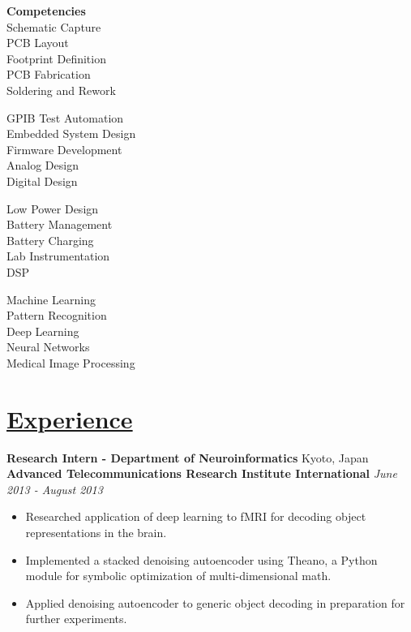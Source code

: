 \documentclass[a4paper, 11pt]{article}
\begin{document}
  \parbox{0.23\textwidth}{
    \textbf{Competencies}\\
    Schematic Capture\\
    PCB Layout\\
    Footprint Definition\\
    PCB Fabrication\\
    Soldering and Rework
  } \hfill
  \parbox{0.26\textwidth}{
    \bigskip
    GPIB Test Automation\\
    Embedded System Design\\
    Firmware Development\\
    Analog Design\\
    Digital Design
  } \hfill
  \parbox{0.21\textwidth}{
    \bigskip
    Low Power Design\\
    Battery Management\\
    Battery Charging\\
    Lab Instrumentation\\
    DSP
    } \hfill
  \parbox{0.25\textwidth}{
    \bigskip
    Machine Learning\\
    Pattern Recognition\\
    Deep Learning\\
    Neural Networks\\
    Medical Image Processing
  } \hfill
 
\section{\underline{Experience}}
  \textbf{Research Intern - Department of Neuroinformatics}
  \hfill
  Kyoto, Japan \\
  \textbf{Advanced Telecommunications Research Institute International}
  \hfill
  \emph{June 2013 - August 2013}
  \begin{itemize}[nosep]
    \item Researched application of deep learning to fMRI for decoding object representations in the brain.
    \item Implemented a stacked denoising autoencoder using Theano, a Python module for symbolic optimization of multi-dimensional math.
    \item Applied denoising autoencoder to generic object decoding in preparation for further experiments.
  \end{itemize}
  \medskip
  
\end{document}
